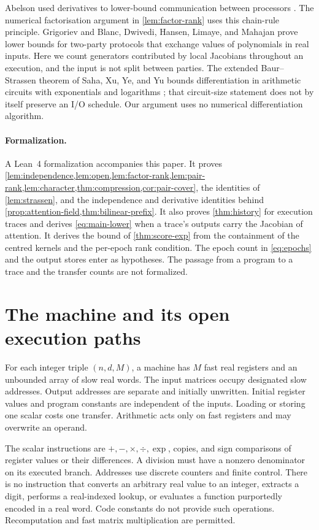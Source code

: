 \documentclass[11pt]{article}
\theoremstyle{definition}
\theoremstyle{remark}
\begin{document}
Abelson used derivatives to lower-bound communication between
processors \cite{abelson1980}. The numerical factorisation argument
in \cref{lem:factor-rank} uses this chain-rule principle. Grigoriev
\cite{grigoriev2008} and Blanc, Dwivedi, Hansen, Limaye, and Mahajan
\cite{blanc2026} prove lower bounds for two-party protocols that
exchange values of polynomials in real inputs. Here we count generators
contributed by local Jacobians throughout an execution, and the input
is not split between parties. The extended Baur--Strassen theorem of Saha, Xu, Ye, and Yu
bounds differentiation in arithmetic circuits with exponentials and
logarithms \cite[Theorem~4.4]{sahaxuyeyu2026}; that circuit-size
statement does not by itself preserve an I/O schedule. Our argument
uses no numerical differentiation algorithm.

\paragraph{Formalization.}
A Lean~4 formalization accompanies this paper. It proves
\cref{lem:independence,lem:open,lem:factor-rank,lem:pair-rank,lem:character,thm:compression,cor:pair-cover},
the identities of \cref{lem:strassen}, and the independence and derivative
identities behind \cref{prop:attention-field,thm:bilinear-prefix}. It also
proves \cref{thm:history} for execution traces and derives
\cref{eq:main-lower} when a trace's outputs carry the Jacobian of
attention. It derives the bound of \cref{thm:score-exp} from the
containment of the centred kernels and the per-epoch rank condition.
The epoch count in \cref{eq:epochs} and the output stores enter as
hypotheses. The passage from a program to a trace and the transfer counts
are not formalized.

\section{The machine and its open execution paths}
\label{sec:model}
For each integer triple $(n,d,M)$, a machine has $M$ fast real registers
and an unbounded array of slow real words. The input matrices occupy
designated slow addresses. Output addresses are separate and initially
unwritten. Initial register values and program constants are
independent of the inputs. Loading or storing one scalar costs one
transfer. Arithmetic acts only on fast registers and may overwrite an
operand. 

The scalar instructions are $+,-,\times,\div,\exp$, copies, and sign
comparisons of register values or their differences. A division must
have a nonzero denominator on its executed branch. Addresses use
discrete counters and finite control. There is no instruction that
converts an arbitrary real value to an integer, extracts a digit,
performs a real-indexed lookup, or evaluates a function purportedly
encoded in a real word. Code constants do not provide such operations.
Recomputation and fast matrix multiplication are permitted.
\end{document}
